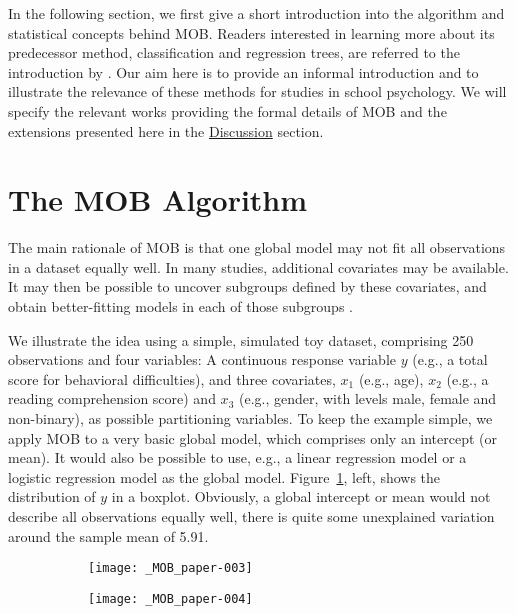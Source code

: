 \documentclass[doc,floatsintext,natbib]{apa7}
\begin{document}
In the following section, we first give a short introduction into the algorithm and statistical concepts behind MOB. Readers interested in learning more about its predecessor method, classification and regression trees, are referred to the introduction by \citet{StrMalTut:2009:PM}. Our aim here is to provide an informal introduction and to illustrate the relevance of these methods for studies in school psychology. We will specify the relevant works providing the formal details of MOB and the extensions presented here in the \hyperref[sec:discussion]{Discussion} section. 

\section{The MOB Algorithm}

The main rationale of MOB is that one global model may not fit all observations in a dataset equally well. In many studies, additional covariates may be available. It may then be possible to uncover subgroups defined by these covariates, and obtain better-fitting models in each of those subgroups \citep{ZeilyHoth08}. 



We illustrate the idea using a simple, simulated toy dataset, comprising 250 observations and four variables: A continuous response variable $y$ (e.g., a total score for behavioral difficulties), and three covariates, $x_1$ (e.g., age), $x_2$ (e.g., a reading comprehension score) and $x_3$ (e.g., gender, with levels male, female and non-binary), as possible partitioning variables. To keep the example simple, we apply MOB to a very basic global model, which comprises %
only an intercept (or mean). It would also be possible to use, e.g., a linear regression model or a logistic regression model as the global model. Figure~\ref{fig:toy}, left, shows the distribution of $y$ in a boxplot. Obviously, a global intercept or mean would not describe all observations equally well, there is quite some unexplained variation around the sample mean of 5.91.


\begin{figure}[h]
\caption{Left: Univariate distribution of the response variable. Right: Tree with group-specific distributions of the response variable in the terminal nodes.}
\begin{subfigure}[][][t]{.4\textwidth}
\texttt{[image: \_MOB\_paper-003]}
\end{subfigure}
\begin{subfigure}[][][b]{.7\textwidth}
\texttt{[image: \_MOB\_paper-004]}
\end{subfigure}
\label{fig:toy}
\end{figure}
\end{document}
